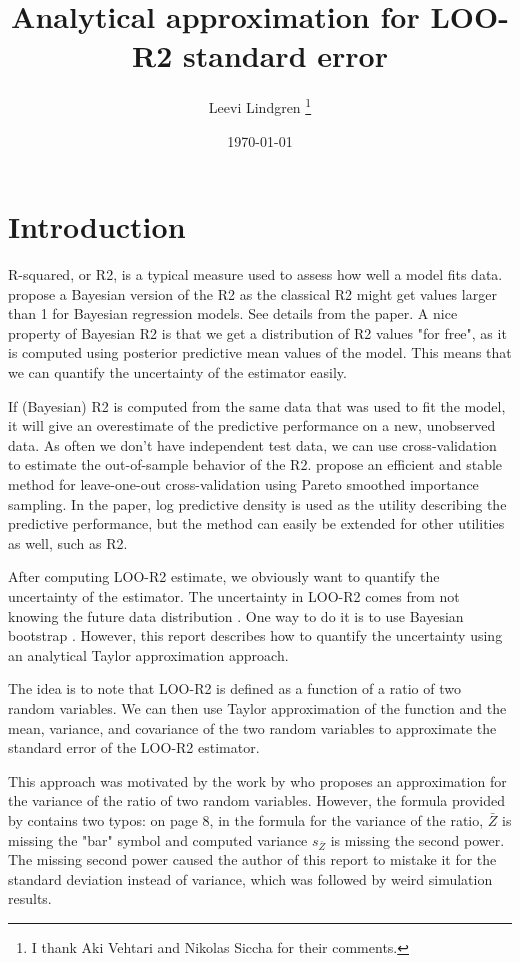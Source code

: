 \documentclass{article}
\title{Analytical approximation for LOO-R2 standard error}
\author{Leevi Lindgren \footnote{I thank Aki Vehtari and Nikolas Siccha for their comments.}}
\date{\today}
\begin{document}
\maketitle

\section{Introduction}
R-squared, or R2, is a typical measure used to assess how well a model fits data. \cite{gelman_r-squared_2019} propose a Bayesian version of the R2 as the classical R2 might get values larger than 1 for Bayesian regression models. See details from the paper. A nice property of Bayesian R2 is that we get a distribution of R2 values "for free", as it is computed using posterior predictive mean values of the model. This means that we can quantify the uncertainty of the estimator easily.

If (Bayesian) R2 is computed from the same data that was used to fit the model, it will give an overestimate of the predictive performance on a new, unobserved data. As often we don't have independent test data, we can use cross-validation to estimate the out-of-sample behavior of the R2. \cite{vehtari_practical_2016} propose an efficient and stable method for leave-one-out cross-validation using Pareto smoothed importance sampling. In the paper, log predictive density is used as the utility describing the predictive performance, but the method can easily be extended for other utilities as well, such as R2.

After computing LOO-R2 estimate, we obviously want to quantify the uncertainty of the estimator. The uncertainty in LOO-R2 comes from not knowing the future data distribution \citep{vehtari_survey_2012}. One way to do it is to use Bayesian bootstrap \citep{rubin_bayesian_1981}. However, this report describes how to quantify the uncertainty using an analytical Taylor approximation approach.

The idea is to note that LOO-R2 is defined as a function of a ratio of two random variables. We can then use Taylor approximation of the function and the mean, variance, and covariance of the two random variables to approximate the standard error of the LOO-R2 estimator. 

This approach was motivated by the work by \cite{hastings1970monte} who proposes an approximation for the variance of the ratio of two random variables. However, the formula provided by \cite{hastings1970monte} contains two typos: on page 8, in the formula for the variance of the ratio, $\bar{Z}$ is missing the "bar" symbol and computed variance $s_{\bar{Z}}$ is missing the second power. The missing second power caused the author of this report to mistake it for the standard deviation instead of variance, which was followed by weird simulation results. 
\end{document}
